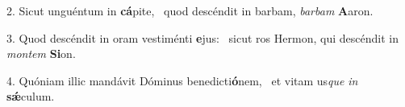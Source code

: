 2. Sicut unguéntum in \textbf{cá}pite, \ast\  quod descéndit in barbam, \textit{bar}\textit{bam} \textbf{A}aron.\

3. Quod descéndit in oram vestiménti \textbf{e}jus: \ast\  sicut ros Hermon, qui descéndit in \textit{mon}\textit{tem} \textbf{Si}on.\

4. Quóniam illic mandávit Dóminus benedicti\textbf{ó}nem, \ast\  et vitam us\textit{que} \textit{in} \textbf{sǽ}culum.\


